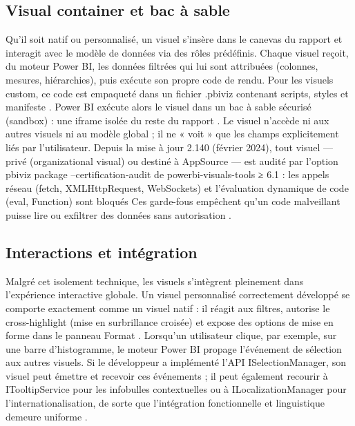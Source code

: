 \subsection{Visual container et bac à sable}
\label{subsec:sandbox}

Qu’il soit natif ou personnalisé, un visuel s’insère dans le canevas du rapport et interagit avec le modèle de données via des rôles prédéfinis.  
Chaque visuel reçoit, du moteur Power BI, les données filtrées qui lui sont attribuées (colonnes, mesures, hiérarchies), puis exécute son propre code de rendu.  
Pour les visuels custom, ce code est empaqueté dans un fichier .pbiviz contenant scripts, styles et manifeste \parencite{MicrosoftPbivizDocs2023}.  
Power BI exécute alors le visuel dans un bac à sable sécurisé (sandbox) : une iframe isolée du reste du rapport \parencite{OkVizSandbox2022}.  
Le visuel n’accède ni aux autres visuels ni au modèle global ; il ne « voit » que les champs explicitement liés par l’utilisateur.  
Depuis la mise à jour 2.140 (février 2024), tout visuel — privé (organizational visual) ou destiné à AppSource — est audité par l’option pbiviz package --certification-audit de powerbi-visuals-tools ≥ 6.1 : les appels réseau (fetch, XMLHttpRequest, WebSockets) et l’évaluation dynamique de code (eval, Function) sont bloqués 
Ces garde-fous empêchent qu’un code malveillant puisse lire ou exfiltrer des données sans autorisation \parencite{MediumSecurityPBI2023}.

\subsection{Interactions et intégration}
\label{subsec:interactions}

Malgré cet isolement technique, les visuels s’intègrent pleinement dans l’expérience interactive globale.  
Un visuel personnalisé correctement développé se comporte exactement comme un visuel natif : il réagit aux filtres, autorise le cross-highlight (mise en surbrillance croisée) et expose des options de mise en forme dans le panneau Format \parencite{MicrosoftCustomVisGuide2024}.  
Lorsqu’un utilisateur clique, par exemple, sur une barre d’histogramme, le moteur Power BI propage l’événement de sélection aux autres visuels.  
Si le développeur a implémenté l’API ISelectionManager, son visuel peut émettre et recevoir ces événements ; il peut également recourir à ITooltipService pour les infobulles contextuelles ou à ILocalizationManager pour l’internationalisation, de sorte que l’intégration fonctionnelle et linguistique demeure uniforme \parencite{MicrosoftSelectionAPI2024, MicrosoftTooltipAPI2024}.  

